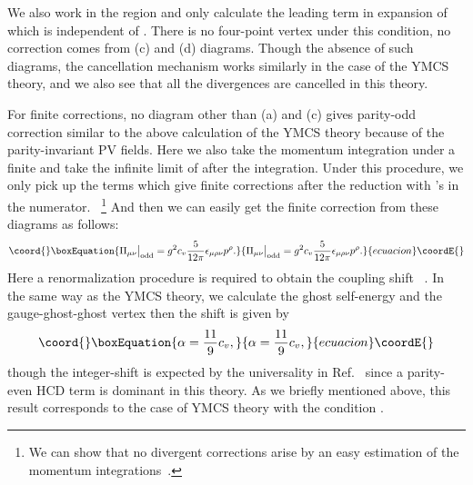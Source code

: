 \documentclass[a4paper,12pt]{article}
\begin{document}
We also work in the region \coordHE{}
and only calculate the leading term
in expansion of \myHighlight{$\Lambda$}\coordHE{}
which is independent of \myHighlight{$\Lambda$}\coordHE{}.
%
%
There is no four-point vertex under this condition,
no correction comes from (c) and (d) diagrams.
%
Though the absence of such diagrams,
the cancellation mechanism works similarly in the case of the YMCS theory,
and we also see that all the divergences are cancelled in this theory.
%






For finite corrections,
no diagram other than (a) and (c) gives parity-odd correction
similar to the above calculation of the YMCS theory
because of the parity-invariant PV fields.
%
Here we also take the momentum integration
under a finite \coordHE{}
and take the infinite limit of \myHighlight{$\Lambda$}\coordHE{} after the integration.
%
Under this procedure,
we only pick up the terms which give finite corrections
after the reduction with \myHighlight{$\Lambda$}\coordHE{}'s in the numerator.%
~\footnote{%
 We can show that no divergent corrections arise
 by an easy estimation of the momentum integrations~\cite{Nittoh:2001full}.
 } 
%
And then we can easily get the finite correction from these diagrams
as follows:
%
\begin{equation}\coord{}\boxEquation{
\Pi_{\mu\nu}\big|_\mathrm{odd}=
g^2c_v\frac{5}{12\pi}\epsilon_{\mu\rho\nu}p^\rho.
}{
\Pi_{\mu\nu}\big|_\mathrm{odd}=
g^2c_v\frac{5}{12\pi}\epsilon_{\mu\rho\nu}p^\rho.
}{ecuacion}\coordE{}\end{equation}
%
Here a renormalization procedure is required to obtain the coupling shift%
~\cite{Giavarini:1992xz,Giavarini:1993xb,Chen:1997nv}.
%
In the same way as the YMCS theory,
we calculate the ghost self-energy and the gauge-ghost-ghost vertex
then the shift is given by
%
\begin{equation}\coord{}\boxEquation{
\alpha=\frac{11}{9}c_v,
}{
\alpha=\frac{11}{9}c_v,
}{ecuacion}\coordE{}\end{equation}
%
though the integer-shift is expected
by the universality in Ref.~\cite{Asorey:1994em}
since a parity-even HCD term is dominant in this theory.
%
As we briefly mentioned above,
this result corresponds to the case of YMCS theory
with the condition \myHighlight{$\mu \gg \Lambda$}\coordHE{}.





\label{sec:conclusions and discussions}
\end{document}

